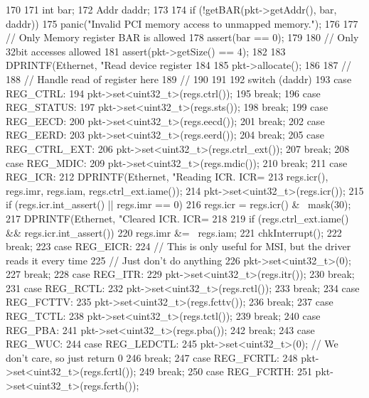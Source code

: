 \begin{DoxyCode}
170 {
171     int bar;
172     Addr daddr;
173 
174     if (!getBAR(pkt->getAddr(), bar, daddr))
175         panic("Invalid PCI memory access to unmapped memory.\n");
176 
177     // Only Memory register BAR is allowed
178     assert(bar == 0);
179 
180     // Only 32bit accesses allowed
181     assert(pkt->getSize() == 4);
182 
183     DPRINTF(Ethernet, "Read device register %
184 
185     pkt->allocate();
186 
187     //
188     // Handle read of register here
189     //
190 
191 
192     switch (daddr) {
193       case REG_CTRL:
194         pkt->set<uint32_t>(regs.ctrl());
195         break;
196       case REG_STATUS:
197         pkt->set<uint32_t>(regs.sts());
198         break;
199       case REG_EECD:
200         pkt->set<uint32_t>(regs.eecd());
201         break;
202       case REG_EERD:
203         pkt->set<uint32_t>(regs.eerd());
204         break;
205       case REG_CTRL_EXT:
206         pkt->set<uint32_t>(regs.ctrl_ext());
207         break;
208       case REG_MDIC:
209         pkt->set<uint32_t>(regs.mdic());
210         break;
211       case REG_ICR:
212         DPRINTF(Ethernet, "Reading ICR. ICR=%
213                 regs.icr(), regs.imr, regs.iam, regs.ctrl_ext.iame());
214         pkt->set<uint32_t>(regs.icr());
215         if (regs.icr.int_assert() || regs.imr == 0) {
216             regs.icr = regs.icr() & ~mask(30);
217             DPRINTF(Ethernet, "Cleared ICR. ICR=%
218         }
219         if (regs.ctrl_ext.iame() && regs.icr.int_assert())
220             regs.imr &= ~regs.iam;
221         chkInterrupt();
222         break;
223       case REG_EICR:
224         // This is only useful for MSI, but the driver reads it every time
225         // Just don't do anything
226         pkt->set<uint32_t>(0);
227         break;
228       case REG_ITR:
229         pkt->set<uint32_t>(regs.itr());
230         break;
231       case REG_RCTL:
232         pkt->set<uint32_t>(regs.rctl());
233         break;
234       case REG_FCTTV:
235         pkt->set<uint32_t>(regs.fcttv());
236         break;
237       case REG_TCTL:
238         pkt->set<uint32_t>(regs.tctl());
239         break;
240       case REG_PBA:
241         pkt->set<uint32_t>(regs.pba());
242         break;
243       case REG_WUC:
244       case REG_LEDCTL:
245         pkt->set<uint32_t>(0); // We don't care, so just return 0
246         break;
247       case REG_FCRTL:
248         pkt->set<uint32_t>(regs.fcrtl());
249         break;
250       case REG_FCRTH:
251         pkt->set<uint32_t>(regs.fcrth());
}}
\end{DoxyCode}
